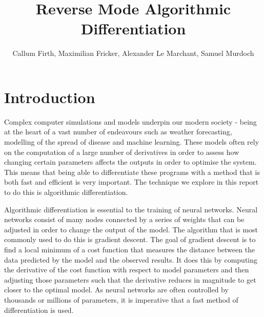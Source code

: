 \documentclass{article}
\title{Reverse Mode Algorithmic Differentiation}
\author{Callum Firth, Maximilian Fricker, Alexander Le Marchant, Samuel Murdoch} %
\date{}
\begin{document}
\maketitle

\tableofcontents
\newpage

\section{Introduction}

Complex computer simulations and models underpin our modern society - being at the heart of a vast number of endeavours such as weather forecasting, modelling of the spread of disease and machine learning. These models often rely on the computation of a large number of derivatives in order to assess how changing certain parameters affects the outputs in order to optimise the system. This means that being able to differentiate these programs with a method that is both fast and efficient is very important. The technique we explore in this report to do this is algorithmic differentiation.

Algorithmic differentiation is essential to the training of neural networks. Neural networks consist of many nodes connected by a series of weights that can be adjusted in order to change the output of the model. The algorithm that is most commonly used to do this is gradient descent. The goal of gradient descent is to find a local minimum of a cost function that measures the distance between the data predicted by the model and the observed results. It does this by computing the derivative of the cost function with respect to model parameters and then adjusting those parameters such that the derivative reduces in magnitude to get closer to the optimal model. As neural networks are often controlled by thousands or millions of parameters, it is imperative that a fast method of differentiation is used.
\end{document}
